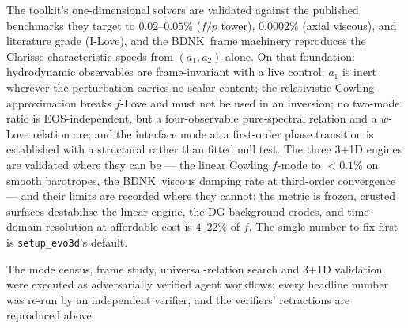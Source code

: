 \documentclass[aps,prd,preprint,amsmath,amssymb,nofootinbib,longbibliography]{revtex4-2}
\newcommand{\BDNK}{BDNK}
\begin{document}
The toolkit's one-dimensional solvers are validated against the published benchmarks they
target to $0.02$--$0.05\%$ ($f/p$ tower), $0.0002\%$ (axial viscous), and literature grade
(I-Love), and the \BDNK\ frame machinery reproduces the Clarisse characteristic speeds from
$(a_1,a_2)$ alone. On that foundation: hydrodynamic observables are frame-invariant with a live
control; $a_1$ is inert wherever the perturbation carries no scalar content; the relativistic
Cowling approximation breaks $f$-Love and must not be used in an inversion; no two-mode ratio is
EOS-independent, but a four-observable pure-spectral relation and a $w$-Love relation are; and
the interface mode at a first-order phase transition is established with a structural rather than
fitted null test. The three 3+1D engines are validated where they can be --- the linear Cowling
$f$-mode to $<0.1\%$ on smooth barotropes, the \BDNK\ viscous damping rate at third-order
convergence --- and their limits are recorded where they cannot: the metric is frozen, crusted
surfaces destabilise the linear engine, the DG background erodes, and time-domain resolution at
affordable cost is $4$--$22\%$ of $f$. The single number to fix first is
\texttt{setup\_evo3d}'s default.

\begin{acknowledgments}
The mode census, frame study, universal-relation search and 3+1D validation were executed as
adversarially verified agent workflows; every headline number was re-run by an independent
verifier, and the verifiers' retractions are reproduced above.
\end{acknowledgments}
\end{document}
